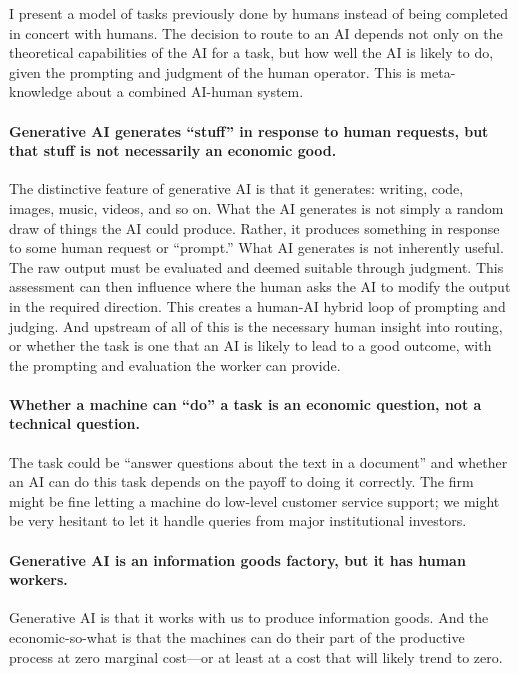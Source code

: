 \documentclass{article}
\begin{document}
I present a model of tasks previously done by humans instead of being completed in concert with humans. 
The decision to route to an AI depends not only on the theoretical capabilities of the AI for a task, but how well the AI is likely to do, given the prompting and judgment of the human operator. 
This is meta-knowledge about a combined AI-human system.

\paragraph{Generative AI generates ``stuff'' in response to human requests, but that stuff is not necessarily an economic good.}
The distinctive feature of generative AI is that it generates: writing, code, images, music, videos, and so on.
What the AI generates is not simply a random draw of things the AI could produce.
Rather, it produces something in response to some human request or ``prompt.''
What AI generates is not inherently useful. 
The raw output must be evaluated and deemed suitable through judgment.
This assessment can then influence where the human asks the AI to modify the output in the required direction. 
This creates a human-AI hybrid loop of prompting and judging. 
And upstream of all of this is the necessary human insight into routing, or whether the task is one that an AI is likely to lead to a good outcome, with the prompting and evaluation the worker can provide. 

\paragraph{Whether a machine can ``do'' a task is an economic question, not a technical question.}
The task could be ``answer questions about the text in a document'' and whether an AI can do this task depends on the payoff to doing it correctly. 
The firm might be fine letting a machine do low-level customer service support; we might be very hesitant to let it handle queries from major institutional investors.

\paragraph{Generative AI is an information goods factory, but it has human workers.}
Generative AI is that it works with us to produce information goods. 
And the economic-so-what is that the machines can do their part of the productive process at zero marginal cost---or at least at a cost that will likely trend to zero.
\end{document}
